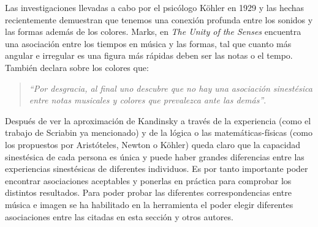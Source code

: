 Las investigaciones llevadas a cabo por el psicólogo Köhler en 1929 \cite{GestaltPsychology} y las hechas recientemente demuestran que tenemos una conexión profunda entre los sonidos y las formas además de los colores. Marks, en \emph{The Unity of the Senses} \cite{TheUnityOfTheSenses} encuentra una asociación entre los tiempos en música y las formas, tal que cuanto más angular e irregular es una figura más rápidas deben ser las notas o el tempo. También declara sobre los colores que:
\begin{quote}
\emph{``Por desgracia, al final uno descubre que no hay una asociación sinestésica entre notas musicales y colores que prevalezca ante las demás''}.\\
\end{quote}

Después de ver la aproximación de Kandinsky a través de la experiencia (como el trabajo de Scriabin ya mencionado) y de la lógica o las matemáticas-físicas (como los propuestos por Aristóteles, Newton o Köhler) queda claro que la capacidad sinestésica de cada persona es única y puede haber grandes diferencias entre las experiencias sinestésicas de diferentes individuos. Es por tanto importante poder encontrar asociaciones aceptables y ponerlas en práctica para comprobar los distintos resultados. Para poder probar las diferentes correspondencias entre música e imagen se ha habilitado en la herramienta el poder elegir diferentes asociaciones entre las citadas en esta sección y otros autores.